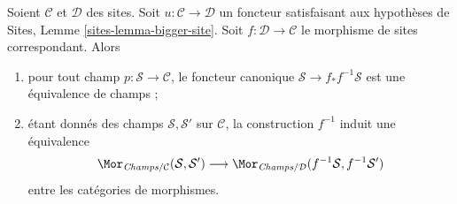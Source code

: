 \begin{lemma}
\label{lemma-bigger-site}
Soient $\mathcal{C}$ et $\mathcal{D}$ des sites.
Soit $u : \mathcal{C} \to \mathcal{D}$ un foncteur satisfaisant aux
hypothèses de
Sites, Lemme \ref{sites-lemma-bigger-site}.
Soit $f : \mathcal{D} \to \mathcal{C}$ le morphisme de sites
correspondant. Alors
\begin{enumerate}
\item pour tout champ $p : \mathcal{S} \to \mathcal{C}$, le
foncteur canonique $\mathcal{S} \to f_*f^{-1}\mathcal{S}$ est
une équivalence de champs ;
\item étant donnés des champs $\mathcal{S}, \mathcal{S}'$ sur $\mathcal{C}$,
la construction $f^{-1}$
induit une équivalence
$$
\Mor_{\textit{Champs}/\mathcal{C}}(\mathcal{S}, \mathcal{S}')
\longrightarrow
\Mor_{\textit{Champs}/\mathcal{D}}(f^{-1}\mathcal{S}, f^{-1}\mathcal{S}')
$$
entre les catégories de morphismes.
\end{enumerate}
\end{lemma}

